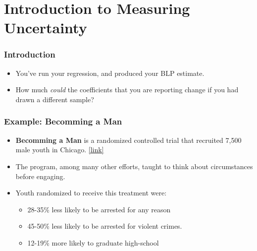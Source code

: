 \documentclass[12pt, block=fill]{beamer}
\begin{document}
\section{Introduction to Measuring Uncertainty} 

\begin{frame} 
  \frametitle{Introduction}
  \begin{itemize}
    \item You've run your regression, and produced your BLP estimate.
    \item How much \textit{could} the coefficients that you are reporting change if you had drawn a different sample?
  \end{itemize}
\end{frame}

\begin{frame}
  \frametitle{Example: Becomming a Man}
  \begin{itemize}
  \item \textbf{Becomming a Man} is a randomized controlled trial that recruited 7,500 male youth in Chicago. \href{https://www.nber.org/system/files/working_papers/w21178/w21178.pdf}{[link]}
  \item The program, among many other efforts, taught to think about circumstances before engaging.
  \item Youth randomized to receive this treatment were:
    \begin{itemize}
    \item 28-35\% less likely to be arrested for any reason
    \item 45-50\% less likely to be arrested for violent crimes.
    \item 12-19\% more likely to graduate high-school
    \end{itemize}
  \end{itemize}
\end{frame}
\end{document}
